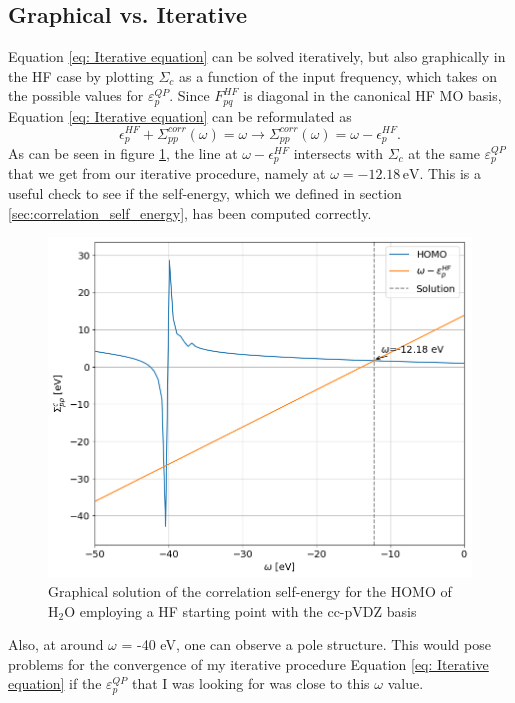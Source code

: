 \documentclass[12pt]{caltech_thesis}
\begin{document}
\subsection{Graphical vs. Iterative}
Equation \ref{eq: Iterative equation} can be solved iteratively, but also graphically in the HF case by plotting $\Sigma _{c}$ as a function of the input frequency, which takes on  the possible values for $\varepsilon_{p}^{QP}$. Since $F_{pq}^{HF}$ is diagonal in the canonical HF MO basis, Equation \ref{eq: Iterative equation} can be reformulated as
\begin{equation}
    \epsilon _{p}^{HF} + \Sigma_{pp}^{corr}(\omega) = \omega  \rightarrow \Sigma_{pp}^{corr}(\omega) = \omega  - \epsilon _{p}^{HF}.
\end{equation}
As can be seen in figure \ref{fig:graphic}, the line at $\omega - \epsilon_{p}^{HF}$ intersects with $\Sigma _{c}$ at the same $\varepsilon_{p}^{QP}$ that we get from our iterative procedure, namely at $\omega = -12.18 \, \mathrm{eV}$.
 This is a useful check to see if the self-energy, which we defined in section \ref{sec:correlation_self_energy}, has been computed correctly.
\begin{figure}[h]
    \centering
    \includegraphics[width=\textwidth]{correlation_energies.png}
\caption{Graphical solution of the correlation self-energy for the HOMO of $\mathrm{H_2O}$ employing a HF starting point with the cc-pVDZ basis}
\label{fig:graphic}
\end{figure}
Also, at around $\omega$ = -40 eV, one can observe a pole structure. This would pose problems for the convergence of my iterative procedure Equation \ref{eq: Iterative equation} if the $\varepsilon_{p}^{QP}$ that I was looking for was close to this $\omega $ value. \autocite{veril2018unphysical}
\newpage
\end{document}
